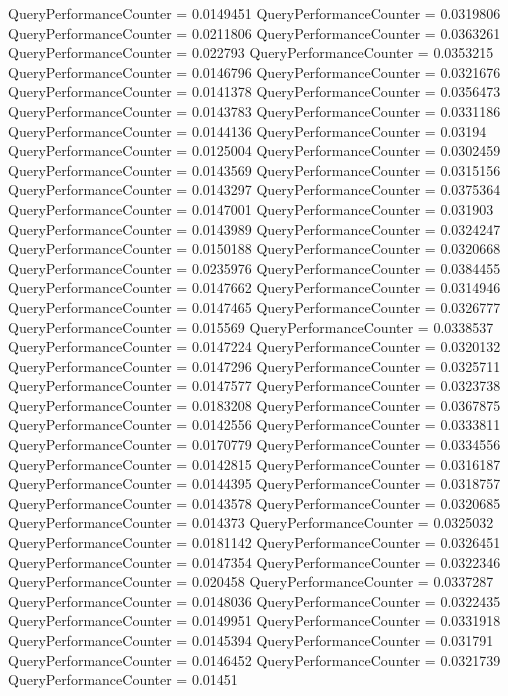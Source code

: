\documentclass[9pt]{article}
\theoremstyle{plain}
\theoremstyle{definition}
\theoremstyle{remark}
\numberwithin{equation}{section}
\begin{document}
QueryPerformanceCounter  =  0.0149451
QueryPerformanceCounter  =  0.0319806
QueryPerformanceCounter  =  0.0211806
QueryPerformanceCounter  =  0.0363261
QueryPerformanceCounter  =  0.022793
QueryPerformanceCounter  =  0.0353215
QueryPerformanceCounter  =  0.0146796
QueryPerformanceCounter  =  0.0321676
QueryPerformanceCounter  =  0.0141378
QueryPerformanceCounter  =  0.0356473
QueryPerformanceCounter  =  0.0143783
QueryPerformanceCounter  =  0.0331186
QueryPerformanceCounter  =  0.0144136
QueryPerformanceCounter  =  0.03194
QueryPerformanceCounter  =  0.0125004
QueryPerformanceCounter  =  0.0302459
QueryPerformanceCounter  =  0.0143569
QueryPerformanceCounter  =  0.0315156
QueryPerformanceCounter  =  0.0143297
QueryPerformanceCounter  =  0.0375364
QueryPerformanceCounter  =  0.0147001
QueryPerformanceCounter  =  0.031903
QueryPerformanceCounter  =  0.0143989
QueryPerformanceCounter  =  0.0324247
QueryPerformanceCounter  =  0.0150188
QueryPerformanceCounter  =  0.0320668
QueryPerformanceCounter  =  0.0235976
QueryPerformanceCounter  =  0.0384455
QueryPerformanceCounter  =  0.0147662
QueryPerformanceCounter  =  0.0314946
QueryPerformanceCounter  =  0.0147465
QueryPerformanceCounter  =  0.0326777
QueryPerformanceCounter  =  0.015569
QueryPerformanceCounter  =  0.0338537
QueryPerformanceCounter  =  0.0147224
QueryPerformanceCounter  =  0.0320132
QueryPerformanceCounter  =  0.0147296
QueryPerformanceCounter  =  0.0325711
QueryPerformanceCounter  =  0.0147577
QueryPerformanceCounter  =  0.0323738
QueryPerformanceCounter  =  0.0183208
QueryPerformanceCounter  =  0.0367875
QueryPerformanceCounter  =  0.0142556
QueryPerformanceCounter  =  0.0333811
QueryPerformanceCounter  =  0.0170779
QueryPerformanceCounter  =  0.0334556
QueryPerformanceCounter  =  0.0142815
QueryPerformanceCounter  =  0.0316187
QueryPerformanceCounter  =  0.0144395
QueryPerformanceCounter  =  0.0318757
QueryPerformanceCounter  =  0.0143578
QueryPerformanceCounter  =  0.0320685
QueryPerformanceCounter  =  0.014373
QueryPerformanceCounter  =  0.0325032
QueryPerformanceCounter  =  0.0181142
QueryPerformanceCounter  =  0.0326451
QueryPerformanceCounter  =  0.0147354
QueryPerformanceCounter  =  0.0322346
QueryPerformanceCounter  =  0.020458
QueryPerformanceCounter  =  0.0337287
QueryPerformanceCounter  =  0.0148036
QueryPerformanceCounter  =  0.0322435
QueryPerformanceCounter  =  0.0149951
QueryPerformanceCounter  =  0.0331918
QueryPerformanceCounter  =  0.0145394
QueryPerformanceCounter  =  0.031791
QueryPerformanceCounter  =  0.0146452
QueryPerformanceCounter  =  0.0321739
QueryPerformanceCounter  =  0.01451
\end{document}
